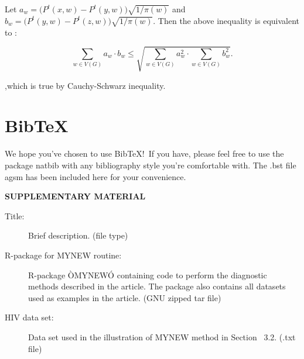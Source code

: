 \documentclass[12pt]{article}
\theoremstyle{definition}
\begin{document}
	Let $a_{w} = \big(P^{t}(x,w) - P^{t}(y,w) \big) \sqrt{1 / \pi(w)}$ and $b_{w} = \big( P^{t}(y,w) - P^{t}(z,w) \big) \sqrt{1 / \pi(w)}$. Then the above inequality is equivalent to :
	
	\begin{equation} 
	\sum\limits_{w \in V(G)} a_{w} \cdot b_{w} \leq \sqrt{\sum\limits_{w \in V(G)} a^2_{w} \cdot \sum\limits_{w \in V(G)} b^2_{w} }.
	\end{equation}
	
	,which is true by Cauchy-Schwarz inequality.
	
	
	
	\section{BibTeX}
	
	We hope you've chosen to use BibTeX!\ If you have, please feel free to use the package natbib with any bibliography style you're comfortable with. The .bst file agsm has been included here for your convenience. 
	
	
	
	
	
	\newpage
	\bigskip
	\begin{center}
		{\large\bf SUPPLEMENTARY MATERIAL}
	\end{center}
	
	\begin{description}
		
		\item[Title:] Brief description. (file type)
		
		\item[R-package for  MYNEW routine:] R-package ÒMYNEWÓ containing code to perform the diagnostic methods described in the article. The package also contains all datasets used as examples in the article. (GNU zipped tar file)
		
		\item[HIV data set:] Data set used in the illustration of MYNEW method in Section~ 3.2. (.txt file)
	\end{description}
	
	
\end{document}
